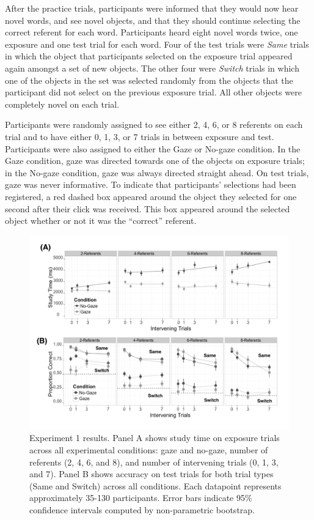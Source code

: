 \documentclass[12pt,]{article}
\begin{document}
After the practice trials, participants were informed that they would
now hear novel words, and see novel objects, and that they should
continue selecting the correct referent for each word. Participants
heard eight novel words twice, one exposure and one test trial for each
word. Four of the test trials were \emph{Same} trials in which the
object that participants selected on the exposure trial appeared again
amongst a set of new objects. The other four were \emph{Switch} trials
in which one of the objects in the set was selected randomly from the
objects that the participant did not select on the previous exposure
trial. All other objects were completely novel on each trial.

Participants were randomly assigned to see either 2, 4, 6, or 8
referents on each trial and to have either 0, 1, 3, or 7 trials in
between exposure and test. Participants were also assigned to either the
Gaze or No-gaze condition. In the Gaze condition, gaze was directed
towards one of the objects on exposure trials; in the No-gaze condition,
gaze was always directed straight ahead. On test trials, gaze was never
informative. To indicate that participants' selections had been
registered, a red dashed box appeared around the object they selected
for one second after their click was received. This box appeared around
the selected object whether or not it was the ``correct'' referent.

\begin{figure}[htbp]
\centering
\includegraphics{figs/expt1 plot-1.pdf}
\caption{Experiment 1 results. Panel A shows study time on exposure
trials across all experimental conditions: gaze and no-gaze, number of
referents (2, 4, 6, and 8), and number of intervening trials (0, 1, 3,
and 7). Panel B shows accuracy on test trials for both trial types (Same
and Switch) across all conditions. Each datapoint represents
approximately 35-130 participants. Error bars indicate 95\% confidence
intervals computed by non-parametric bootstrap.}
\end{figure}
\end{document}

